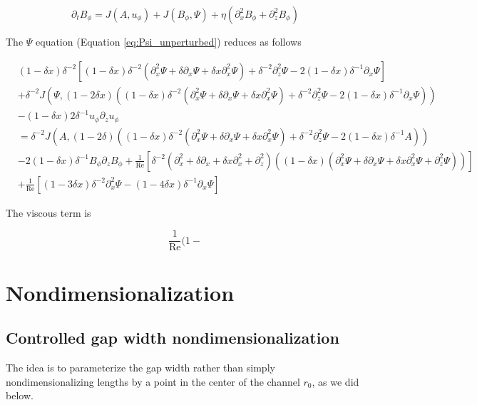 \documentclass{paper}
\newcommand{\beq}{\begin{equation}}
\newcommand{\eeq}{\end{equation}}
\newcommand\reye{\mathrm{Re}}
\begin{document}
\beq
\partial_t B_\phi = J(A, u_\phi) + J(B_\phi, \Psi) + \eta(\partial_x^2 B_\phi + \partial_z^2 B_\phi)
\eeq

The $\Psi$ equation (Equation \ref{eq:Psi_unperturbed}) reduces as follows

\beq
\begin{split}
& (1 - \delta x) \delta^{-2} \left[(1 - \delta x) \delta^{-2} \left(\partial_x^2 \Psi + \delta \partial_x \Psi + \delta x \partial_x^2 \Psi \right) + \delta^{-2} \partial_z^2 \Psi - 2(1 - \delta x)\delta^{-1}\partial_x \Psi \right] \\
& + \delta^{-2} J(\Psi, (1-2\delta x)\left((1 - \delta x) \delta^{-2} \left(\partial_x^2 \Psi + \delta \partial_x \Psi + \delta x \partial_x^2 \Psi \right) + \delta^{-2} \partial_z^2 \Psi - 2(1 - \delta x)\delta^{-1}\partial_x \Psi \right)) \\
& - (1 - \delta x)2\delta^{-1} u_\phi \partial_z u_\phi \\
& = \delta^{-2} J(A, (1 - 2 \delta)\left((1 - \delta x) \delta^{-2} \left(\partial_x^2 \Psi + \delta \partial_x \Psi + \delta x \partial_x^2 \Psi \right) + \delta^{-2} \partial_z^2 \Psi - 2(1 - \delta x) \delta^{-1} A \right)) \\
& - 2(1 - \delta x)\delta^{-1} B_\phi \partial_z B_\phi + \frac{1}{\reye} \left[\delta^{-2}(\partial_x^2 + \delta \partial_x + \delta x \partial_x^2 + \partial_z^2)((1 - \delta x)(\partial_x^2\Psi + \delta \partial_x\Psi + \delta x \partial_x^2\Psi + \partial_z^2\Psi))\right] \\
& + \frac{1}{\reye}\left[(1 - 3\delta x)\delta^{-2} \partial_x^2 \Psi - (1 - 4 \delta x)\delta^{-1}\partial_x \Psi \right]
\end{split}
\eeq

The viscous term is

\beq
\frac{1}{\reye} (1 - 
\eeq


\section{Nondimensionalization}

\subsection{Controlled gap width nondimensionalization}

The idea is to parameterize the gap width rather than simply nondimensionalizing lengths by a point in the center of the channel $r_0$, as we did below.
\end{document}
